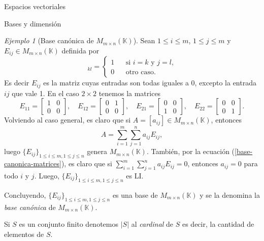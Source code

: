 \documentclass[a4paper,12pt,twoside,spanish,reqno]{amsbook}
\numberwithin{equation}{section}
\theoremstyle{definition}
\theoremstyle{remark}
\newtheorem*{ejemplo*}{Ejemplo}
\newcommand{\K}{\mathbb K}
\begin{document}
\begin{chapter}{Espacios vectoriales}
\begin{section}{Bases y dimensión}
\begin{ejemplo*}[{\sc Base canónica de $M_{m \times n}(\K)$}] 
    Sean $1 \le i \le m$, $1\le j \le m$ y $E_{ij} \in M_{m \times n}(\K)$ definida por
    \begin{equation*}
        [E_{ij}]_{kl} = \left\{ 
        \begin{array}{lll}
        1& &\text{si $i=k$ y $j=l$,} \\
        0& &\text{otro caso}. 
        \end{array}
         \right.
    \end{equation*}
    Es decir $E_{ij}$  es la matriz cuyas entradas son todas iguales a 0,  excepto la entrada $ij$ que vale 1. En el caso $2 \times 2$  tenemos la matrices
    \begin{equation*}
        E_{11} = \begin{bmatrix} 1&0\\0&0\end{bmatrix}, \quad
        E_{12} = \begin{bmatrix} 0&1\\0&0\end{bmatrix}, \quad
        E_{21} = \begin{bmatrix} 0&0\\1&0\end{bmatrix}, \quad
        E_{22} = \begin{bmatrix} 0&0\\0&1\end{bmatrix}.
    \end{equation*}
    Volviendo al caso general,  es claro que si $A= [a_{ij}] \in M_{m \times n}(\K)$,  entonces
    \begin{equation}\label{base-canonica-matrices}
        A = \sum_{i=1}^{m} \sum_{j=1}^{n} a_{ij}E_{ij},
    \end{equation}
    luego $\{E_{ij} \}_{1 \le i \le m, 1\le j \le n}$ genera $M_{m \times n}(\K)$. También, por la ecuación (\ref{base-canonica-matrices}), es claro que si $\sum_{i=1}^{m} \sum_{j=1}^{n} a_{ij}E_{ij}=0$,  entonces $a_{ij}=0$ para todo $i$ y $j$. Luego,  $\{E_{ij} \}_{1 \le i \le m, 1\le j \le n}$ es LI. 
    
    Concluyendo,  $\{E_{ij} \}_{1 \le i \le m, 1\le j \le n}$ es una base de  $M_{m \times n}(\K)$ y se la denomina la \textit{base canónica} de  $M_{m \times n}(\K)$.
\end{ejemplo*}



Si $S$ es un conjunto finito denotemos $|S|$  al \textit{cardinal} de  $S$ es decir, la cantidad de elementos de $S$. 


\end{section}
\end{chapter}
\end{document}
